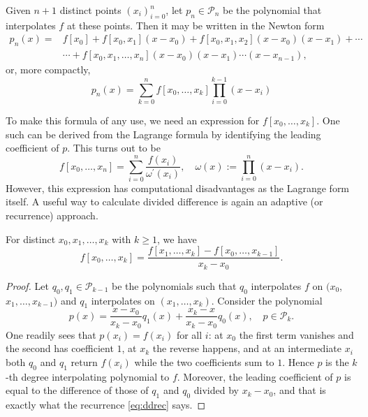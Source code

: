 \documentclass[a4paper]{scrartcl}
\begin{document}
\begin{theorem}
Given $n+1$ distinct points $\left(x_{i}\right)_{i=0}^{n}$, let $p_{n} \in \mathcal{P}_{n}$ be the polynomial that interpolates $f$ at these points. Then it may be written in the Newton form
\begin{align*}
  p_{n}(x)=& f\left[x_{0}\right]+f\left[x_{0}, x_{1}\right]\left(x-x_{0}\right)+f\left[x_{0}, x_{1}, x_{2}\right]\left(x-x_{0}\right)\left(x-x_{1}\right)+\cdots \\
  & \cdots+f\left[x_{0}, x_{1}, \ldots, x_{n}\right]\left(x-x_{0}\right)\left(x-x_{1}\right) \cdots\left(x-x_{n-1}\right),
\end{align*}
or, more compactly,
$$
p_{n}(x)=\sum_{k=0}^{n} f\left[x_{0}, \ldots, x_{k}\right] \prod_{i=0}^{k-1}\left(x-x_{i}\right)
$$
\end{theorem}

To make this formula of any use, we need an expression for $f[x_0, \dots, x_k]$. One such can be derived from the Lagrange formula by identifying the leading coefficient of $p$. This turns out to be
$$
f\left[x_{0}, \ldots, x_{n}\right]=\sum_{i=0}^{n} \frac{f\left(x_{i}\right)}{\omega^{\prime}\left(x_{i}\right)}, \quad \omega(x):=\prod_{i=0}^{n}\left(x-x_{i}\right) .
$$
However, this expression has computational disadvantages as the Lagrange form itself. A useful way to calculate divided difference is again an adaptive (or recurrence) approach.

\begin{theorem}
  For distinct $x_0, x_1, \dots, x_k$ with $k \geq 1$, we have
  \begin{equation}\label{eq:ddrec}
  f[x_0, \dots, x_k] = \frac{f[x_1, \dots, x_k] - f[x_0, \dots, x_{k - 1}]}{x_k - x_0}.
  \end{equation}
\end{theorem}
\begin{proof}
  Let $q_0, q_1 \in \mathcal{P}_{k - 1}$ be the polynomials such that $q_0$ interpolates $f$ on $(x_0$, $x_1, \dots, x_{k - 1})$ and $q_1$ interpolates on $(x_1, \dots, x_k)$. Consider the polynomial
  $$
  p(x)=\frac{x-x_{0}}{x_{k}-x_{0}} q_{1}(x)+\frac{x_{k}-x}{x_{k}-x_{0}} q_{0}(x), \quad p \in \mathcal{P}_{k} .
  $$
  One readily sees that $p\left(x_{i}\right)=f\left(x_{i}\right)$ for all $i$: at $x_0$ the first term vanishes and the second has coefficient $1$, at $x_k$ the reverse happens, and at an intermediate $x_i$ both $q_0$ and $q_1$ return $f(x_i)$ while the two coefficients sum to $1$. Hence $p$ is the $k$-th degree interpolating polynomial to $f$. Moreover, the leading coefficient of $p$ is equal to the difference of those of $q_{1}$ and $q_{0}$ divided by $x_{k}-x_{0}$, and that is exactly what the recurrence \eqref{eq:ddrec} says.
\end{proof}
\end{document}
